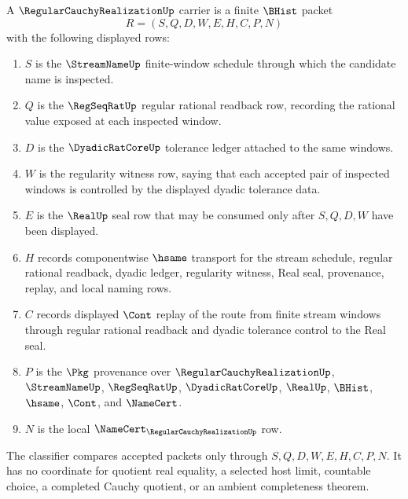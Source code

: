 \begin{definition}
\label{def:regular-cauchy-realization-carrier}
A $\RegularCauchyRealizationUp$ carrier is a finite $\BHist$ packet
$$
R=(S,Q,D,W,E,H,C,P,N)
$$
with the following displayed rows:
\begin{enumerate}
\item $S$ is the $\StreamNameUp$ finite-window schedule through which the candidate name is inspected.
\item $Q$ is the $\RegSeqRatUp$ regular rational readback row, recording the rational value exposed at each inspected window.
\item $D$ is the $\DyadicRatCoreUp$ tolerance ledger attached to the same windows.
\item $W$ is the regularity witness row, saying that each accepted pair of inspected windows is controlled by the displayed dyadic tolerance data.
\item $E$ is the $\RealUp$ seal row that may be consumed only after $S,Q,D,W$ have been displayed.
\item $H$ records componentwise $\hsame$ transport for the stream schedule, regular rational readback, dyadic ledger, regularity witness, Real seal, provenance, replay, and local naming rows.
\item $C$ records displayed $\Cont$ replay of the route from finite stream windows through regular rational readback and dyadic tolerance control to the Real seal.
\item $P$ is the $\Pkg$ provenance over $\RegularCauchyRealizationUp$, $\StreamNameUp$, $\RegSeqRatUp$, $\DyadicRatCoreUp$, $\RealUp$, $\BHist$, $\hsame$, $\Cont$, and $\NameCert$.
\item $N$ is the local $\NameCert_{\RegularCauchyRealizationUp}$ row.
\end{enumerate}
The classifier compares accepted packets only through $S,Q,D,W,E,H,C,P,N$. It has no coordinate for quotient real equality, a selected host limit, countable choice, a completed Cauchy quotient, or an ambient completeness theorem.
\end{definition}

